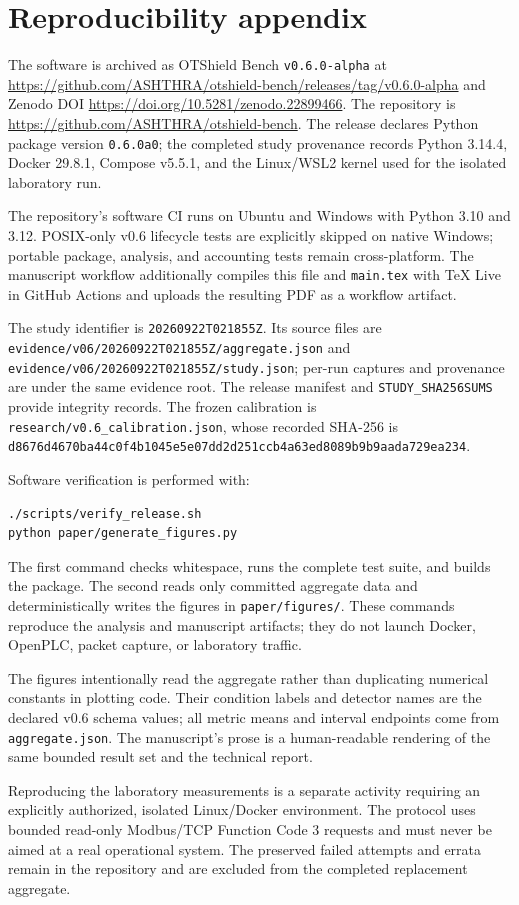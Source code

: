 \section*{Reproducibility appendix}
\label{app:reproducibility}

The software is archived as OTShield Bench \texttt{v0.6.0-alpha} at
\url{https://github.com/ASHTHRA/otshield-bench/releases/tag/v0.6.0-alpha} and
Zenodo DOI \url{https://doi.org/10.5281/zenodo.22899466}. The repository is
\url{https://github.com/ASHTHRA/otshield-bench}. The release declares Python
package version \texttt{0.6.0a0}; the completed study provenance records Python
3.14.4, Docker 29.8.1, Compose v5.5.1, and the Linux/WSL2 kernel used for the
isolated laboratory run.

The repository's software CI runs on Ubuntu and Windows with Python 3.10 and
3.12. POSIX-only v0.6 lifecycle tests are explicitly skipped on native Windows;
portable package, analysis, and accounting tests remain cross-platform. The
manuscript workflow additionally compiles this file and \texttt{main.tex} with
TeX Live in GitHub Actions and uploads the resulting PDF as a workflow artifact.

The study identifier is \texttt{20260922T021855Z}. Its source files are
\texttt{evidence/v06/20260922T021855Z/aggregate.json} and
\texttt{evidence/v06/20260922T021855Z/study.json}; per-run captures and
provenance are under the same evidence root. The release manifest and
\texttt{STUDY\_SHA256SUMS} provide integrity records. The frozen calibration is
\texttt{research/v0.6\_calibration.json}, whose recorded SHA-256 is
\texttt{d8676d4670ba44c0f4b1045e5e07dd2d251ccb4a63ed8089b9b9aada729ea234}.

Software verification is performed with:

\begin{verbatim}
./scripts/verify_release.sh
python paper/generate_figures.py
\end{verbatim}

The first command checks whitespace, runs the complete test suite, and builds
the package. The second reads only committed aggregate data and deterministically
writes the figures in \texttt{paper/figures/}. These commands reproduce the
analysis and manuscript artifacts; they do not launch Docker, OpenPLC, packet
capture, or laboratory traffic.

The figures intentionally read the aggregate rather than duplicating numerical
constants in plotting code. Their condition labels and detector names are the
declared v0.6 schema values; all metric means and interval endpoints come from
\texttt{aggregate.json}. The manuscript's prose is a human-readable rendering
of the same bounded result set and the technical report.

Reproducing the laboratory measurements is a separate activity requiring an
explicitly authorized, isolated Linux/Docker environment. The protocol uses
bounded read-only Modbus/TCP Function Code 3 requests and must never be aimed at
a real operational system. The preserved failed attempts and errata remain in
the repository and are excluded from the completed replacement aggregate.

